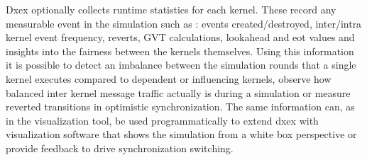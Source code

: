 Dxex optionally collects runtime statistics for each kernel. These record any measurable event in the simulation such as : events created/destroyed, inter/intra kernel event frequency, reverts, GVT calculations, lookahead and eot values and insights into the fairness between the kernels themselves. Using this information it is possible to detect an imbalance between the simulation rounds that a single kernel executes compared to dependent or influencing kernels, observe how balanced inter kernel message traffic actually is during a simulation or measure reverted transitions in optimistic synchronization.
The same information can, as in the visualization tool, be used programmatically to extend dxex with visualization software that shows the simulation from a white box perspective or provide feedback to drive synchronization switching.

